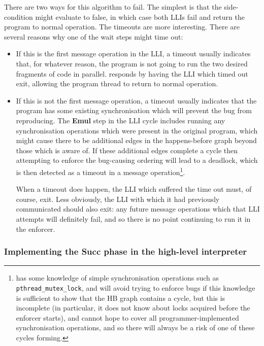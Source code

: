 There are two ways for this algorithm to fail.  The simplest is that
the side-condition might evaluate to false, in which case both LLIs
fail and return the program to normal operation.  The timeouts are
more interesting.  There are several reasons why one of the wait steps
might time out:

\begin{itemize}
\item
  If this is the first message operation in the LLI, a timeout usually
  indicates that, for whatever reason, the program is not going to run
  the two desired fragments of code in parallel.  {\Technique}
  responds by having the LLI which timed out exit, allowing the
  program thread to return to normal operation.

\item
  If this is not the first message operation, a timeout usually
  indicates that the program has some existing synchronisation which
  will prevent the bug from reproducing.  The \textbf{Emul} step in
  the LLI cycle includes running any synchronisation operations which
  were present in the original program, which might cause there to be
  additional edges in the happens-before graph beyond those which
  {\technique} is aware of.  If these additional edges complete a
  cycle then attempting to enforce the bug-causing ordering will lead
  to a deadlock, which is then detected as a timeout in a message
  operation\footnote{{\Technique} has some knowledge of simple
    synchronisation operations such as \texttt{pthread\_mutex\_lock},
    and will avoid trying to enforce bugs if this knowledge is
    sufficient to show that the HB graph contains a cycle, but this is
    incomplete (in particular, it does not know about locks acquired
    before the enforcer starts), and cannot hope to cover all
    programmer-implemented synchronisation operations\cite{Xiong2010},
    and so there will always be a risk of one of these cycles
    forming.}.

  When a timeout does happen, the LLI which suffered the time out
  must, of course, exit.  Less obviously, the LLI with which it had
  previously communicated should also exit: any future message
  operations which that LLI attempts will definitely fail, and so
  there is no point continuing to run it in the enforcer.
\end{itemize}


\subsubsection{Implementing the \textbf{Succ} phase in the high-level interpreter}
\label{sect:enforce:succ}

